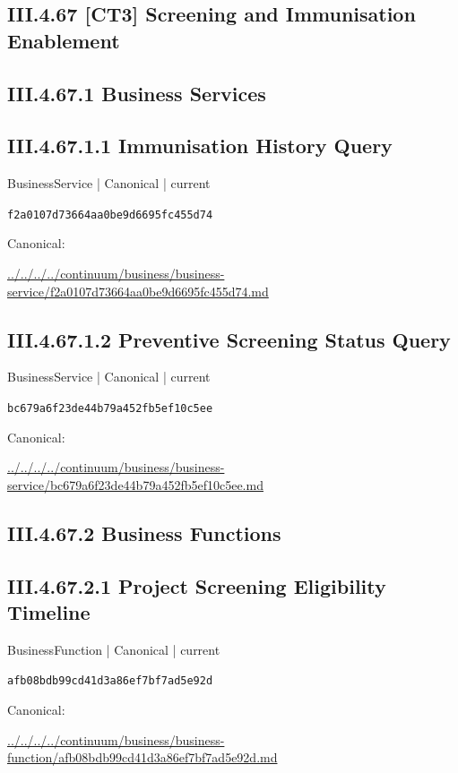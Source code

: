 \documentclass[10pt,a4paper]{article}
\begin{document}
\subsection*{III.4.67 [CT3] Screening and Immunisation Enablement}
\subsection*{III.4.67.1 Business Services}
\subsection*{III.4.67.1.1 Immunisation History Query}
{\small BusinessService | Canonical | current}\par
\texttt{f2a0107d73664aa0be9d6695fc455d74}\par
Canonical: \par
{\footnotesize\url{../../../../continuum/business/business-service/f2a0107d73664aa0be9d6695fc455d74.md}}\par
\subsection*{III.4.67.1.2 Preventive Screening Status Query}
{\small BusinessService | Canonical | current}\par
\texttt{bc679a6f23de44b79a452fb5ef10c5ee}\par
Canonical: \par
{\footnotesize\url{../../../../continuum/business/business-service/bc679a6f23de44b79a452fb5ef10c5ee.md}}\par
\subsection*{III.4.67.2 Business Functions}
\subsection*{III.4.67.2.1 Project Screening Eligibility Timeline}
{\small BusinessFunction | Canonical | current}\par
\texttt{afb08bdb99cd41d3a86ef7bf7ad5e92d}\par
Canonical: \par
{\footnotesize\url{../../../../continuum/business/business-function/afb08bdb99cd41d3a86ef7bf7ad5e92d.md}}\par
\end{document}
